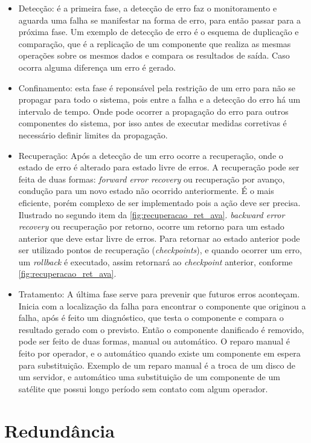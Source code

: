 \begin{itemize}
 \item Detecção: é a primeira fase, a detecção de erro faz o monitoramento e aguarda uma falha se manifestar na forma de erro, para então
 passar para a próxima fase. Um exemplo de detecção de erro é o esquema de duplicação e comparação, que é a replicação de um componente
 que realiza as mesmas operações sobre os mesmos dados e compara os resultados de saída. Caso ocorra alguma diferença um erro é gerado.
 \item Confinamento: esta fase é reponsável pela restrição de um erro para não se propagar para todo o sistema, pois entre a falha e a
 detecção do erro há um intervalo de tempo. Onde pode ocorrer a propagação do erro para outros componentes do sistema, por isso antes de
 executar medidas corretivas é necessário definir limites da propagação.
 \item Recuperação: Após a detecção de um erro ocorre a recuperação, onde o estado de erro é alterado para estado livre de erros. A recuperação
 pode ser feita de duas formas:
 \subitem \textit{forward error recovery} ou recuperação por avanço, condução para um novo estado não ocorrido anteriormente. É o mais eficiente, 
 porém complexo de ser implementado pois a ação deve ser precisa. Ilustrado no segundo item da \ref{fig:recuperacao_ret_ava}.
 \subitem \textit{backward error recovery} ou recuperação por retorno, ocorre um retorno para um estado anterior que deve estar livre de erros.
 Para retornar ao estado anterior pode ser utilizado pontos de recuperação (\textit{checkpoints}), e quando ocorrer um erro, um \textit{rollback} 
 é executado, assim retornará ao \textit{checkpoint} anterior, conforme \ref{fig:recuperacao_ret_ava}.
 \item Tratamento: A última fase serve para prevenir que futuros erros aconteçam. Inicia com a localização da falha para encontrar o componente
 que originou a falha, após é feito um diagnóstico, que testa o componente e compara o resultado gerado com o previsto. Então o componente 
 danificado é removido, pode ser feito de duas formas, manual ou automático. O reparo manual é feito por operador, e o automático quando existe
 um componente em espera para substituição. Exemplo de um reparo manual é a troca de um disco de um servidor, e automático uma substituição
 de um componente de um satélite que possui longo período sem contato com algum operador.
\end{itemize}

\section{Redundância}

